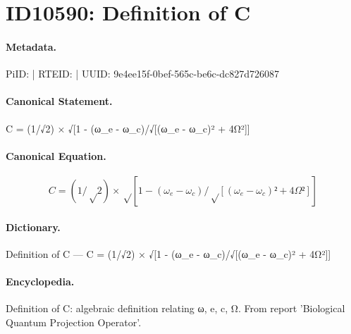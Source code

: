 \section*{ID10590: Definition of C}
\paragraph{Metadata.}
PiID:  | RTEID:  | UUID: 9e4ee15f-0bef-565c-be6c-dc827d726087

\paragraph{Canonical Statement.}
C = (1/√2) × √[1 - (ω\_e - ω\_c)/√[(ω\_e - ω\_c)² + 4Ω²]]

\paragraph{Canonical Equation.}
\[
C = (1/√2) × √[1 - (ω_e - ω_c)/√[(ω_e - ω_c)² + 4Ω²]]
\]

\paragraph{Dictionary.}
Definition of C — C = (1/√2) × √[1 - (ω\_e - ω\_c)/√[(ω\_e - ω\_c)² + 4Ω²]]

\paragraph{Encyclopedia.}
Definition of C: algebraic definition relating ω, e, c, Ω. From report 'Biological Quantum Projection Operator'.
